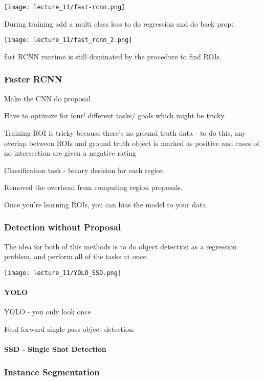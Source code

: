 \texttt{[image: lecture\_11/fast-rcnn.png]}

During training add a multi class loss to do regression and do back prop:

\texttt{[image: lecture\_11/fast\_rcnn\_2.png]}

fast RCNN runtime is still dominated by the procedure to find ROIs.

\subsubsection{Faster RCNN}

Make the CNN do proposal 

Have to optimize for four! different tasks/ goals which might be tricky

Training ROI is tricky because there's no ground truth data - to do this, any overlap between ROIs and ground truth object is marked as positive and cases of no intersection are given a negative rating

Classification task - binary decision for each region

Removed the overhead from computing region proposals.

Once you're learning ROIs, you can bias the model to your data.

\subsubsection{Detection without Proposal}

The idea for both of this methods is to do object detection as a regression problem, and perform all of the tasks at once.

\texttt{[image: lecture\_11/YOLO\_SSD.png]}

\paragraph{YOLO}

YOLO - you only look once

Feed forward single pass object detection.


\paragraph{SSD - Single Shot Detection}

\subsubsection{Instance Segmentation}

